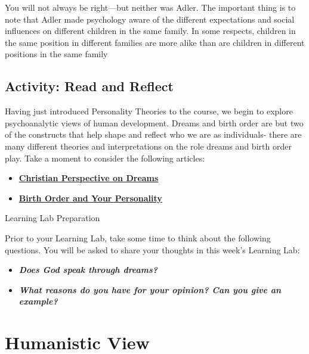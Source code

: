 \documentclass[
]{book}
\providecommand{\tightlist}{%
  \setlength{\itemsep}{0pt}\setlength{\parskip}{0pt}}
\begin{document}
You will not always be right---but neither was Adler. The important thing is to note that Adler made psychology aware of the different expectations and social influences on different children in the same family. In some respects, children in the same position in different families are more alike than are children in differ­ent positions in the same family

\hypertarget{activity-read-and-reflect-2}{%
\subsection*{Activity: Read and Reflect}\label{activity-read-and-reflect-2}}

\begin{reflect}
Having just introduced Personality Theories to the course, we begin to explore psychoanalytic views of human development. Dreams and birth order are but two of the constructs that help shape and reflect who we are as individuals- there are many different theories and interpretations on the role dreams and birth order play. Take a moment to consider the following articles:

\begin{itemize}
\tightlist
\item
  \href{https://www.cgg.org/index.cfm/fuseaction/Library.sr/CT/BQA/k/96/What-Is-Proper-Christian-Perspective-on-Dreams-Visions.htm}{\textbf{Christian Perspective on Dreams}}\\
\item
  \href{https://www.scientificamerican.com/article/ruled-by-birth-order/}{\textbf{Birth Order and Your Personality}}
\end{itemize}

{Learning Lab Preparation}

Prior to your Learning Lab, take some time to think about the following questions. You will be asked to share your thoughts in this week's Learning Lab:

\begin{itemize}
\tightlist
\item
  \textbf{\emph{Does God speak through dreams?}}\\
\item
  \textbf{\emph{What reasons do you have for your opinion? Can you give an example?}}
\end{itemize}
\end{reflect}

\hypertarget{humanistic-view}{%
\section{Humanistic View}\label{humanistic-view}}
\end{document}
